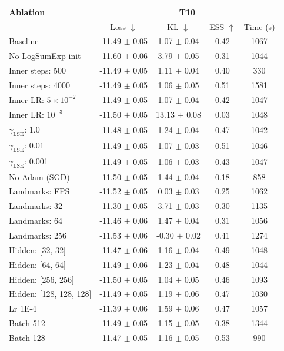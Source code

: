 \begin{tabular}{lcccc}
\toprule
\textbf{Ablation} & \multicolumn{4}{c}{\textbf{T10}} \\
 & Loss $\downarrow$ & KL $\downarrow$ & ESS $\uparrow$ & Time (s) \\
\midrule
Baseline & -11.49 $\pm$ 0.05 & 1.07 $\pm$ 0.04 & 0.42 & 1067 \\
No LogSumExp init & -11.60 $\pm$ 0.06 & 3.79 $\pm$ 0.05 & 0.31 & 1044 \\
Inner steps: 500 & -11.49 $\pm$ 0.05 & 1.11 $\pm$ 0.04 & 0.40 & 330 \\
Inner steps: 4000 & -11.49 $\pm$ 0.05 & 1.06 $\pm$ 0.05 & 0.51 & 1581 \\
Inner LR: $5 \times 10^{-2}$ & -11.49 $\pm$ 0.05 & 1.07 $\pm$ 0.04 & 0.42 & 1047 \\
Inner LR: $10^{-3}$ & -11.50 $\pm$ 0.05 & 13.13 $\pm$ 0.08 & 0.03 & 1048 \\
$\gamma_{\text{LSE}}$: 1.0 & -11.48 $\pm$ 0.05 & 1.24 $\pm$ 0.04 & 0.47 & 1042 \\
$\gamma_{\text{LSE}}$: 0.01 & -11.49 $\pm$ 0.05 & 1.07 $\pm$ 0.03 & 0.51 & 1046 \\
$\gamma_{\text{LSE}}$: 0.001 & -11.49 $\pm$ 0.05 & 1.06 $\pm$ 0.03 & 0.43 & 1047 \\
No Adam (SGD) & -11.50 $\pm$ 0.05 & 1.44 $\pm$ 0.04 & 0.18 & 858 \\
Landmarks: FPS & -11.52 $\pm$ 0.05 & 0.03 $\pm$ 0.03 & 0.25 & 1062 \\
Landmarks: 32 & -11.30 $\pm$ 0.05 & 3.71 $\pm$ 0.03 & 0.30 & 1135 \\
Landmarks: 64 & -11.46 $\pm$ 0.06 & 1.47 $\pm$ 0.04 & 0.31 & 1056 \\
Landmarks: 256 & -11.53 $\pm$ 0.06 & -0.30 $\pm$ 0.02 & 0.41 & 1274 \\
Hidden: [32, 32] & -11.47 $\pm$ 0.06 & 1.16 $\pm$ 0.04 & 0.49 & 1048 \\
Hidden: [64, 64] & -11.49 $\pm$ 0.06 & 1.23 $\pm$ 0.04 & 0.48 & 1044 \\
Hidden: [256, 256] & -11.50 $\pm$ 0.05 & 1.04 $\pm$ 0.05 & 0.46 & 1093 \\
Hidden: [128, 128, 128] & -11.49 $\pm$ 0.05 & 1.19 $\pm$ 0.06 & 0.47 & 1030 \\
Lr 1E-4 & -11.39 $\pm$ 0.06 & 1.59 $\pm$ 0.06 & 0.47 & 1057 \\
Batch 512 & -11.49 $\pm$ 0.05 & 1.15 $\pm$ 0.05 & 0.38 & 1344 \\
Batch 128 & -11.47 $\pm$ 0.05 & 1.16 $\pm$ 0.05 & 0.53 & 990 \\
\bottomrule
\end{tabular}